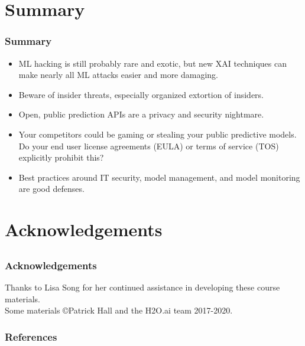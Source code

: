 \documentclass[11pt,
               aspectratio=169,
               hyperref={colorlinks}
               ]{beamer}
\begin{document}
	\section{Summary}

		\begin{frame}
		
			\frametitle{Summary}		
			
			\begin{itemize}
				\item ML hacking is still probably rare and exotic, but new XAI techniques can make nearly all ML attacks easier and more damaging.
				\item Beware of insider threats, especially organized extortion of insiders. 
				\item Open, public prediction APIs are a privacy and security nightmare. 
				\item Your competitors could be gaming or stealing your public predictive models. Do your end user license agreements (EULA) or terms of service (TOS) explicitly prohibit this?
				\item Best practices around IT security, model management, and model monitoring are good defenses.
			\end{itemize}
		
		\end{frame}

\section{Acknowledgements}

\subsection*{}

\begin{frame}
	
	\frametitle{Acknowledgements}
			
	Thanks to Lisa Song for her continued assistance in developing these course materials.\\
	\vspace{10pt}
	Some materials \copyright\hspace{1pt}Patrick Hall and the H2O.ai team 2017-2020.  
	
\end{frame}	


	\begin{frame}[t, allowframebreaks]
	
		\frametitle{References}		
		
		\printbibliography
		
	\end{frame}
\end{document}
